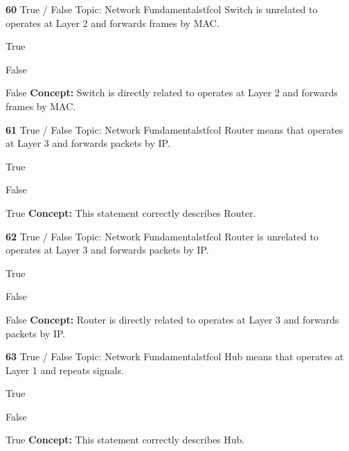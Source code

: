 \documentclass[10pt,a4paper]{article}
\begin{document}
\begin{qcard}{\color{white}\textbf{60} \hfill \small True / False \textbar{} Topic: Network Fundamentals}{tfcol}
Switch is unrelated to operates at Layer 2 and forwards frames by MAC.

\begin{qoptions}
\item True
\item False
\end{qoptions}
\begin{explainbox}{False}
\textbf{Concept:} Switch is directly related to operates at Layer 2 and forwards frames by MAC.
\end{explainbox}
\end{qcard}

\begin{qcard}{\color{white}\textbf{61} \hfill \small True / False \textbar{} Topic: Network Fundamentals}{tfcol}
Router means that operates at Layer 3 and forwards packets by IP.

\begin{qoptions}
\item True
\item False
\end{qoptions}
\begin{explainbox}{True}
\textbf{Concept:} This statement correctly describes Router.
\end{explainbox}
\end{qcard}

\begin{qcard}{\color{white}\textbf{62} \hfill \small True / False \textbar{} Topic: Network Fundamentals}{tfcol}
Router is unrelated to operates at Layer 3 and forwards packets by IP.

\begin{qoptions}
\item True
\item False
\end{qoptions}
\begin{explainbox}{False}
\textbf{Concept:} Router is directly related to operates at Layer 3 and forwards packets by IP.
\end{explainbox}
\end{qcard}

\begin{qcard}{\color{white}\textbf{63} \hfill \small True / False \textbar{} Topic: Network Fundamentals}{tfcol}
Hub means that operates at Layer 1 and repeats signals.

\begin{qoptions}
\item True
\item False
\end{qoptions}
\begin{explainbox}{True}
\textbf{Concept:} This statement correctly describes Hub.
\end{explainbox}
\end{qcard}
\end{document}
